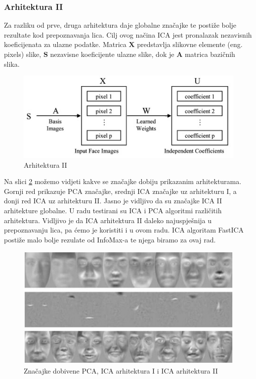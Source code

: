 \documentclass[times, utf8, seminar, numeric]{fer}
\renewcommand{\vec}[1]{\mathbf{#1}}
\begin{document}
\subsubsection{Arhitektura II}
Za razliku od prve, druga arhitektura daje globalne značajke te postiže bolje rezultate kod prepoznavanja lica.
Cilj ovog načina ICA jest pronalazak nezavisnih koeficijenata za ulazne podatke. Matrica $\vec{X}$ predstavlja slikovne elemente (eng. pixels) slike, $\vec{S}$ nezavisne koeficijente ulazne slike, dok je $\vec{A}$ matrica bazičnih slika.

\begin{figure}[!htb]
\centering
\includegraphics{raw/prepoznavanje_arh2.jpg}
\caption{Arhitektura II}
\label{fig:prepoznavanje_arh2}
\end{figure}

Na slici \ref{fig:prepoznavanje_znacajke} možemo vidjeti kakve se značajke dobiju prikazanim arhitekturama. Gornji red prikazuje PCA značajke, srednji ICA značajke uz arhitekturu I, a donji red ICA uz arhitekturu II. Jasno je vidljivo da su značajke ICA II arhitekture globalne. U radu \cite{Draper:2003:RFP:950135.950141} testirani su ICA i PCA algoritmi različitih arhitektura. Vidljivo je da ICA arhitektura II daleko najuspješnija u prepoznavanju lica, pa ćemo je koristiti i u ovom radu. ICA algoritam FastICA postiže malo bolje rezulate od InfoMax-a te njega biramo za ovaj rad.

\begin{figure}[!htb]
\centering
\includegraphics{raw/prepoznavanje_znacajke.jpg}
\caption{Značajke dobivene PCA, ICA arhitektura I i ICA arhitektura II}
\label{fig:prepoznavanje_znacajke}
\end{figure}
\end{document}

